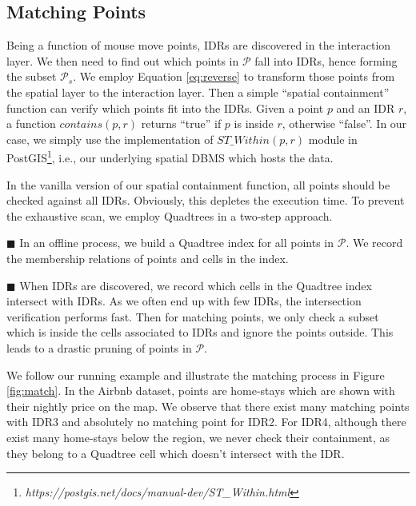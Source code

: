 \subsection{Matching Points}
Being a function of mouse move points, IDRs are discovered in the interaction layer. We then need to find out which points in $\mathcal{P}$ fall into IDRs, hence forming the subset $\mathcal{P}_s$. We employ Equation \ref{eq:reverse} to transform those points from the spatial layer to the interaction layer. Then a simple ``spatial containment'' function can verify which points fit into the IDRs. Given a point $p$ and an IDR $r$, a function $\mathit{contains}(p,r)$ returns ``true'' if $p$ is inside $r$, otherwise ``false''. In our case, we simply use the implementation of $\mathit{ST\_Within}(p,r)$ module in PostGIS\footnote{\it https://postgis.net/docs/manual-dev/ST\_Within.html}, i.e., our underlying spatial DBMS which hosts the data.

\vspace{2pt}
In the vanilla version of our spatial containment function, all points should be checked against all IDRs. Obviously, this depletes the execution time. To prevent the exhaustive scan, we employ Quadtrees in a two-step approach.

\vspace{4pt}
\noindent $\blacksquare$ In an offline process, we build a Quadtree index for all points in $\mathcal{P}$. We record the membership relations of points and cells in the index.

\vspace{2pt}
\noindent $\blacksquare$ When IDRs are discovered, we record which cells in the Quadtree index intersect with IDRs. As we often end up with few IDRs, the intersection verification performs fast. Then for matching points, we only check a subset which is inside the cells associated to IDRs and ignore the points outside. This leads to a drastic pruning of points in $\mathcal{P}$.

\vspace{4pt}
We follow our running example and illustrate the matching process in Figure \ref{fig:match}. In the Airbnb dataset, points are home-stays which are shown with their nightly price on the map. We observe that there exist many matching points with IDR3 and absolutely no matching point for IDR2. For IDR4, although there exist many home-stays below the region, we never check their containment, as they belong to a Quadtree cell which doesn't intersect with the IDR. 

